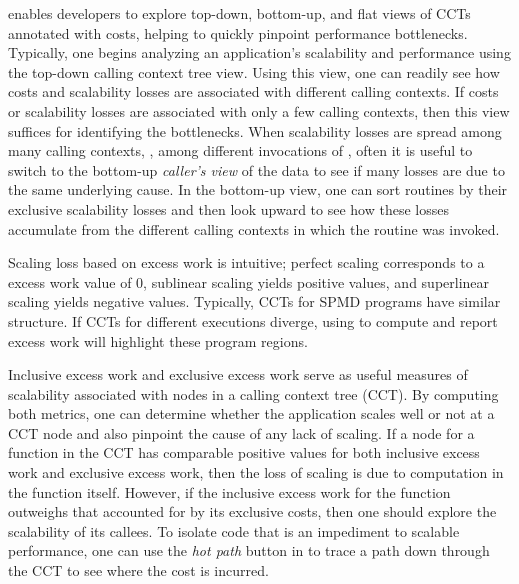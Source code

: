 \documentclass[11pt,letterpaper]{report}
\begin{document}
\hpcviewer{} enables developers to explore top-down, bottom-up, and flat views of CCTs annotated with costs, helping to quickly pinpoint performance bottlenecks.
Typically, one begins analyzing an application's scalability and performance using the top-down calling context tree view.
Using this view, one can readily see how costs and scalability losses are associated with different calling contexts.
If costs or scalability losses are associated with only a few calling contexts, then this view suffices for identifying the bottlenecks.
When scalability losses are spread among many calling contexts, \eg, among different invocations of , often it is useful to switch to the bottom-up {\em caller's view} of the data to see if many losses are due to the same underlying cause.
In the bottom-up view, one can sort routines by their exclusive scalability losses and then look upward to see how these losses accumulate from the different calling contexts in which the routine was invoked.

Scaling loss based on excess work is intuitive; perfect scaling corresponds to a excess work value of $0$, sublinear scaling yields positive values, and superlinear scaling yields negative values.
Typically, CCTs for SPMD programs have similar structure.
If CCTs for different executions diverge, using \hpcviewer{} to compute and report excess work will highlight these program regions.

Inclusive excess work and exclusive excess work serve as useful measures of scalability associated with nodes in a calling context tree (CCT).
By computing both metrics, one can determine whether the application scales well or not at a CCT node and also pinpoint the cause of any lack of scaling.
If a node for a function in the CCT has comparable positive values for both inclusive excess work and exclusive excess work, then the loss of scaling is due to computation in the function itself.
However, if the inclusive excess work for the function outweighs that accounted for by its exclusive costs, then one should explore the scalability of its callees.
To isolate code that is an impediment to scalable performance, one can use the {\em hot path} button in \hpcviewer{} to trace a path down through the CCT to see where the cost is incurred.



\end{document}

